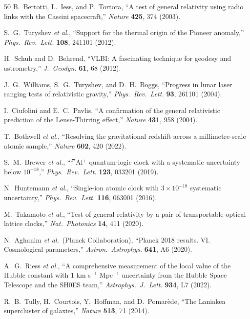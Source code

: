\documentclass[aps,prd,twocolumn,superscriptaddress,nofootinbib,longbibliography]{revtex4-2}
\begin{document}
\begin{thebibliography}{50}
B.~Bertotti, L.~Iess, and P.~Tortora,
``A test of general relativity using radio links with the Cassini
spacecraft,''
\textit{Nature} \textbf{425}, 374 (2003).

S.~G.~Turyshev \textit{et al.},
``Support for the thermal origin of the Pioneer anomaly,''
\textit{Phys.\ Rev.\ Lett.} \textbf{108}, 241101 (2012).

H.~Schuh and D.~Behrend,
``VLBI: A fascinating technique for geodesy and astrometry,''
\textit{J.\ Geodyn.} \textbf{61}, 68 (2012).

J.~G.~Williams, S.~G.~Turyshev, and D.~H.~Boggs,
``Progress in lunar laser ranging tests of relativistic gravity,''
\textit{Phys.\ Rev.\ Lett.} \textbf{93}, 261101 (2004).

I.~Ciufolini and E.~C.~Pavlis,
``A confirmation of the general relativistic prediction of the
Lense-Thirring effect,''
\textit{Nature} \textbf{431}, 958 (2004).

T.~Bothwell \textit{et al.},
``Resolving the gravitational redshift across a millimetre-scale atomic
sample,''
\textit{Nature} \textbf{602}, 420 (2022).

S.~M.~Brewer \textit{et al.},
``$^{27}$Al$^+$ quantum-logic clock with a systematic uncertainty
below $10^{-18}$,''
\textit{Phys.\ Rev.\ Lett.} \textbf{123}, 033201 (2019).

N.~Huntemann \textit{et al.},
``Single-ion atomic clock with $3\times10^{-18}$ systematic
uncertainty,''
\textit{Phys.\ Rev.\ Lett.} \textbf{116}, 063001 (2016).

M.~Takamoto \textit{et al.},
``Test of general relativity by a pair of transportable optical lattice
clocks,''
\textit{Nat.\ Photonics} \textbf{14}, 411 (2020).

N.~Aghanim \textit{et al.}\ (Planck Collaboration),
``Planck 2018 results. VI. Cosmological parameters,''
\textit{Astron.\ Astrophys.} \textbf{641}, A6 (2020).

A.~G.~Riess \textit{et al.},
``A comprehensive measurement of the local value of the Hubble
constant with 1 km s$^{-1}$ Mpc$^{-1}$ uncertainty from the
Hubble Space Telescope and the SH0ES team,''
\textit{Astrophys.\ J.\ Lett.} \textbf{934}, L7 (2022).

R.~B.~Tully, H.~Courtois, Y.~Hoffman, and D.~Pomar\`ede,
``The Laniakea supercluster of galaxies,''
\textit{Nature} \textbf{513}, 71 (2014).


\end{thebibliography}
\end{document}
